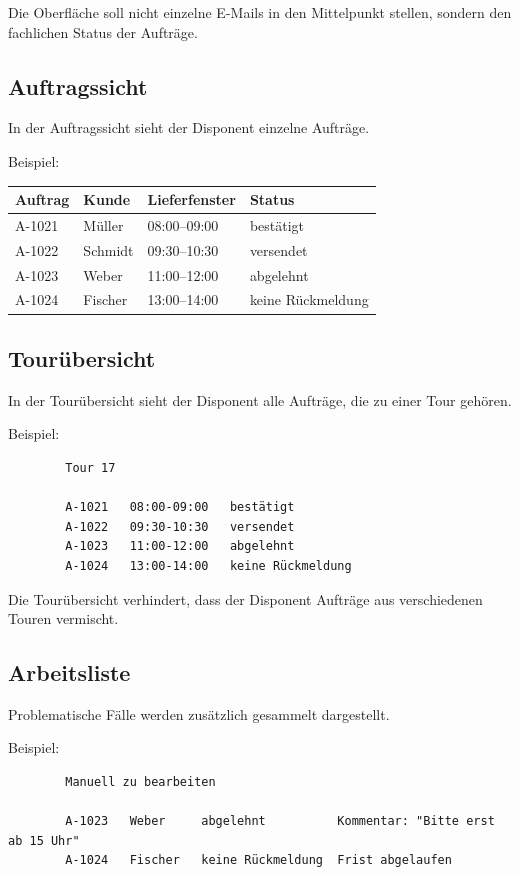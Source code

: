 \documentclass[12pt,a4paper]{article}
\begin{document}
	Die Oberfläche soll nicht einzelne E-Mails in den Mittelpunkt stellen, sondern den fachlichen Status der Aufträge.
	
	\subsection{Auftragssicht}
	
	In der Auftragssicht sieht der Disponent einzelne Aufträge.
	
	Beispiel:
	
	\begin{longtable}{llll}
		\toprule
		\textbf{Auftrag} & \textbf{Kunde} & \textbf{Lieferfenster} & \textbf{Status} \\
		\midrule
		A-1021 & Müller  & 08:00--09:00 & bestätigt \\
		A-1022 & Schmidt & 09:30--10:30 & versendet \\
		A-1023 & Weber   & 11:00--12:00 & abgelehnt \\
		A-1024 & Fischer & 13:00--14:00 & keine Rückmeldung \\
		\bottomrule
	\end{longtable}
	
	\subsection{Tourübersicht}
	
	In der Tourübersicht sieht der Disponent alle Aufträge, die zu einer Tour gehören.
	
	Beispiel:
	
	\begin{lstlisting}
		Tour 17
		
		A-1021   08:00-09:00   bestätigt
		A-1022   09:30-10:30   versendet
		A-1023   11:00-12:00   abgelehnt
		A-1024   13:00-14:00   keine Rückmeldung
	\end{lstlisting}
	
	Die Tourübersicht verhindert, dass der Disponent Aufträge aus verschiedenen Touren vermischt.
	
	\subsection{Arbeitsliste}
	
	Problematische Fälle werden zusätzlich gesammelt dargestellt.
	
	Beispiel:
	
	\begin{lstlisting}
		Manuell zu bearbeiten
		
		A-1023   Weber     abgelehnt          Kommentar: "Bitte erst ab 15 Uhr"
		A-1024   Fischer   keine Rückmeldung  Frist abgelaufen
	\end{lstlisting}
	
\end{document}
